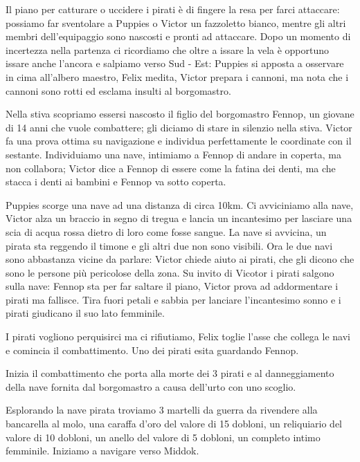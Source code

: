 \documentclass[letterpaper,twocolumn,openany,justified, nodeprecatedcode, nomultitoc]{dndbook}
\begin{document}
Il piano per catturare o uccidere i pirati è di fingere la resa per farci attaccare: possiamo far sventolare a Puppies o Victor un fazzoletto bianco, mentre gli altri membri dell'equipaggio sono nascosti e pronti ad attaccare. Dopo un momento di incertezza nella partenza ci ricordiamo che oltre a issare la vela è opportuno issare anche l'ancora e salpiamo verso Sud - Est: Puppies si apposta a osservare in cima all'albero maestro, Felix medita, Victor prepara i cannoni, ma nota che i cannoni sono rotti ed esclama insulti al borgomastro.

Nella stiva scopriamo essersi nascosto il figlio del borgomastro Fennop, un giovane di 14 anni che vuole combattere; gli diciamo di stare in silenzio nella stiva. Victor fa una prova ottima su navigazione e individua perfettamente le coordinate con il sestante. Individuiamo una nave, intimiamo a Fennop di andare in coperta, ma non collabora; Victor dice a Fennop di essere come la fatina dei denti, ma che stacca i denti ai bambini e Fennop va sotto coperta.

Puppies scorge una nave ad una distanza di circa 10km. Ci avviciniamo alla nave, Victor alza un braccio in segno di tregua e lancia un incantesimo per lasciare una scia di acqua rossa dietro di loro come fosse sangue. La nave si avvicina, un pirata sta reggendo il timone e gli altri due non sono visibili. Ora le due navi sono abbastanza vicine da parlare: Victor chiede aiuto ai pirati, che gli dicono che sono le persone più pericolose della zona. Su invito di Vicotor i pirati salgono sulla nave: Fennop sta per far saltare il piano, Victor prova ad addormentare i pirati ma fallisce. Tira fuori petali e sabbia per lanciare l'incantesimo sonno e i pirati giudicano il suo lato femminile.

I pirati vogliono perquisirci ma ci rifiutiamo, Felix toglie l'asse che collega le navi e comincia il combattimento.
Uno dei pirati esita guardando Fennop.

Inizia il combattimento che porta alla morte dei 3 pirati e al danneggiamento della nave fornita dal borgomastro a causa dell'urto con uno scoglio.

Esplorando la nave pirata troviamo 3 martelli da guerra da rivendere alla bancarella al molo, una caraffa d'oro del valore di 15 dobloni,  un reliquiario del valore di 10 dobloni, un anello del valore di 5 dobloni, un completo intimo femminile. Iniziamo a navigare verso Middok.
\end{document}
